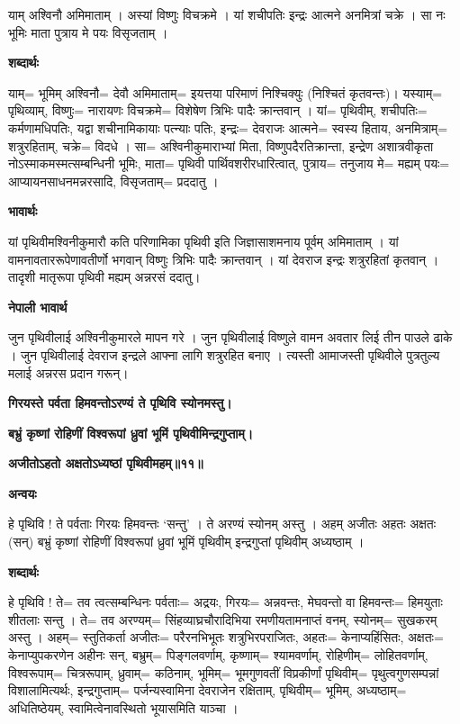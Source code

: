 \documentclass[11pt, a5paper]{article}
\begin{document}
याम् अश्विनौ अमिमाताम् । अस्यां विष्णुः विचक्रमे । यां शचीपतिः इन्द्रः आत्मने अनमित्रां चक्रे । सा नः भूमिः माता पुत्राय मे पयः विसृजताम् ।

\textbf{शब्दार्थः}

याम्= भूमिम् अश्विनौ= देवौ अमिमाताम्= इयत्तया परिमाणं निश्चिक्युः (निश्चितं कृतवन्तः)। यस्याम्= पृथिव्याम्, विष्णुः= नारायणः विचक्रमे= विशेषेण त्रिभिः पादैः क्रान्तवान् । यां= पृथिवीम्, शचीपतिः= कर्मणामधिपतिः, यद्वा शचीनामिकायाः पत्न्याः पतिः, इन्द्रः= देवराजः आत्मने= स्वस्य हिताय, अनमित्राम्= शत्रुरहिताम्, चक्रे= विदधे । सा= अश्विनीकुमाराभ्यां मिता, विष्णुपदैरतिक्रान्ता, इन्द्रेण अशात्रवीकृता नोऽस्माकमस्मत्सम्बन्धिनी भूमिः, माता= पृथिवी पार्थिवशरीरधारित्वात्, पुत्राय= तनुजाय मे= मह्यम् पयः‍‍= आप्यायनसाधनमन्नरसादि, विसृजताम्= प्रददातु ।

\textbf{भावार्थः}

यां पृथिवीमश्विनीकुमारौ कति परिणामिका पृथिवी इति जिज्ञासाशमनाय पूर्वम् अमिमाताम् । यां वामनावताररूपेणावतीर्णो भगवान् विष्णुः त्रिभिः पादैः क्रान्तवान् । यां देवराज इन्द्रः शत्रुरहितां कृतवान् । तादृशी मातृरूपा पृथिवी मह्यम् अन्नरसं ददातु।

\textbf{नेपाली भावार्थ}

जुन पृथिवीलाई अश्विनीकुमारले मापन गरे । जुन पृथिवीलाई विष्णुले वामन अवतार लिई तीन पाउले ढाके । जुन पृथिवीलाई देवराज इन्द्रले आफ्ना लागि शत्रुरहित बनाए । त्यस्ती आमाजस्ती पृथिवीले पुत्रतुल्य मलाई अन्नरस प्रदान गरून्।

\textbf{गिरयस्ते पर्वता हिमवन्तोऽरण्यं ते पृथिवि स्योनमस्तु।}

\textbf{बभ्रुं कृष्णां रोहिणीं विश्वरूपां ध्रुवां भूमिं पृथिवीमिन्द्रगुप्ताम्।}

\textbf{अजीतोऽहतो अक्षतोऽध्यष्ठां पृथिवीमहम्॥११॥}

\textbf{अन्वयः}

हे पृथिवि ! ते पर्वताः गिरयः हिमवन्तः ‘सन्तु’ । ते अरण्यं स्योनम् अस्तु । अहम् अजीतः अहतः अक्षतः (सन्) बभ्रुं कृष्णां रोहिणीं विश्वरूपां ध्रुवां भूमिं पृथिवीम् इन्द्रगुप्तां पृथिवीम् अध्यष्ठाम् ।

\textbf{शब्दार्थः}

हे पृथिवि ! ते= तव त्वत्सम्बन्धिनः पर्वताः= अद्रयः, गिरयः= अन्नवन्तः, मेघवन्तो वा हिमवन्तः= हिमयुताः शीतलाः सन्तु । ते= तव अरण्यम्= सिंहव्याघ्रचौरादिभिया रमणीयतामनाप्तं वनम्, स्योनम्= सुखकरम् अस्तु । अहम्= स्तुतिकर्ता अजीतः= परैरनभिभूतः शत्रुभिरपराजितः, अहतः= केनाप्यहिंसितः, अक्षतः= केनाप्युपकरणेन अहीनः सन्, बभ्रुम्= पिङ्गलवर्णाम्, कृष्णाम्= श्यामवर्णाम्, रोहिणीम्= लोहितवर्णाम्, विश्वरूपाम्= चित्ररूपाम्, ध्रुवाम्= कठिनाम्, भूमिम्= भूमगुणवतीं विप्रकीर्णां पृथिवीम्= पृथुत्वगुणसम्पन्नां विशालामित्यर्थः, इन्द्रगुप्ताम्= पर्जन्यस्वामिना देवराजेन रक्षिताम्, पृथिवीम्= भूमिम्, अध्यष्ठाम्= अधितिष्ठेयम्, स्वामित्वेनावस्थितो भूयासमिति याञ्चा ।
\end{document}
